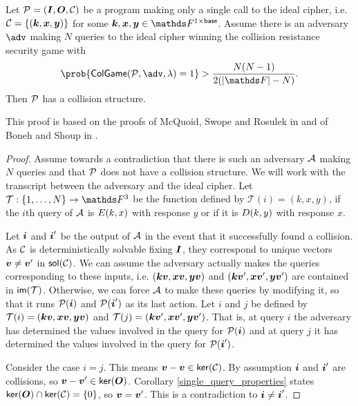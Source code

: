 \begin{prop}
\label{prop_single_query_cr_resistance}
    Let $\P = (\I, \O, \C)$ be a program making only a single call to the ideal cipher,
    i.e. $\C = \{ (\vk, \vx, \vy)\}$ for some $\vk, \vx, \vy \in \Frowsp$.
    Assume there is an adversary $\adv$ making $N$ queries to the ideal cipher winning the collision resistance security game with
    \[
        \prob{\mathsf{ColGame}(\P, \adv, \lambda) = 1 } > \frac{N(N-1)}{2(|\F| - N)}.
    \]
    Then $\P$ has a collision structure.
\end{prop}

This proof is based on the proofs of McQuoid, Swope and Rosulek in \cite[Lemma 10]{TCC:McQSwoRos19} and of Boneh and Shoup in \cite[Theorem 8.4 (Davies-Meyer)]{Boneh2015CourseIA}.

\begin{proof}
    Assume towards a contradiction that there is such an adversary $\A$ making $N$ queries
    and that $\P$ does not have a collision structure.
    We will work with the transcript between the adversary and the ideal cipher.
    Let $\mathcal{T}: \{1, \dots, N\} \to \F^3$ be the function defined by $\mathcal{T}(i) = (k, x, y)$,
    if the $i$th query of $\A$ is $\E(k, x)$ with response $y$ or if it is $\D(k, y)$ with response $x$.

    Let $\v i$ and $\v i'$ be the output of $\A$ in the event that it successfully found a collision.
    As $\C$ is deterministically solvable fixing $\I$, they correspond to unique vectors $\vv \neq \vv'$ in $\sol(\C)$.
    We can assume the adversary actually makes the queries corresponding to these inputs,
    i.e. $(\vk \vv, \vx \vv, \vy \vv)$ and $(\vk \vv', \vx \vv', \vy \vv')$ are contained in $\im(\mathcal{T})$.
    Otherwise, we can force $\A$ to make these queries by modifying it,
    so that it runs $\P(\v i)$ and $\P(\v i')$ as its last action.
    Let $i$ and $j$ be defined by $\mathcal{T}(i) = (\vk \vv, \vx \vv, \vy \vv)$
    and $\mathcal{T}(j) = (\vk \vv', \vx \vv', \vy \vv')$. 
    That is, at query $i$ the adversary has determined the values involved in the query for $\P(\v i)$ and
    at query $j$ it has determined the values involved in the query for $\P(\v i')$.
    
    Consider the case $i = j$.
    This means $\vv - \vv \in \ker(\C)$.
    By assumption $\v i$ and $\v i'$ are collisions, so $\vv - \vv' \in \ker(\O)$.
    Corollary \ref{single_query_properties} states $\ker(\O) \cap \ker(\C) = \{0\}$,
    so $\vv = \vv'$. 
    This is a contradiction to $\v i \neq \v i'$.
    

\end{proof}
